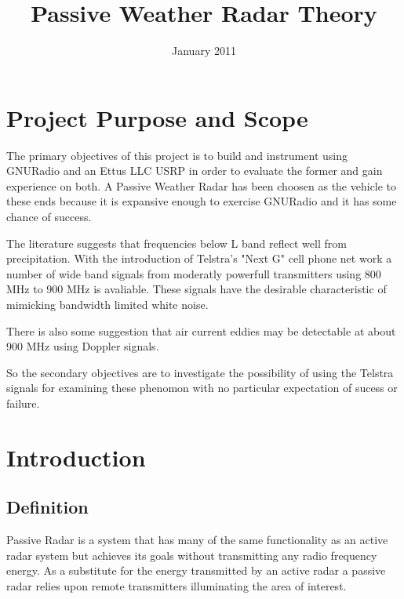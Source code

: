 \documentclass[a4paper]{report}
\title{Passive Weather Radar Theory}
\numberwithin{equation}{chapter}
\begin{document}
\maketitle
\date{January 2011}

\clearpage\setcounter{page}{1}
\thispagestyle{Contents}

\tableofcontents

\clearpage\setcounter{page}{1}
\thispagestyle{Contents}

\listoffigures

\clearpage\setcounter{page}{1}
\chapter[Project Purpose and Scope]{Project Purpose and Scope}
The primary objectives of this project is to build and instrument using GNURadio and an Ettus LLC USRP in order to evaluate the former and gain experience on both. A Passive Weather Radar has been choosen as the vehicle to these ends because it is expansive enough to exercise GNURadio and it has some chance of success.

\bigskip

The literature suggests that frequencies below L band reflect well from precipitation. With the introduction of Telstra's "Next G" cell phone net work a number of wide band signals from moderatly powerfull transmitters using 800 MHz to 900 MHz is avaliable. These signals have the desirable characteristic of mimicking bandwidth limited white noise.

\bigskip

There is also some suggestion that air current eddies may be detectable at about 900 MHz using Doppler signals.

\bigskip

So the secondary objectives are to investigate the possibility of using the Telstra signals for examining these phenomon with no particular expectation of sucess or failure.

\clearpage\setcounter{page}{1}
\chapter[Introduction]{Introduction}
\section{Definition}
Passive Radar is a system that has many of the same functionality as an
active radar system but achieves its goals without transmitting any
radio frequency energy. As a substitute for the energy transmitted by
an active radar a passive radar relies upon remote transmitters
illuminating the area of interest.
\end{document}

